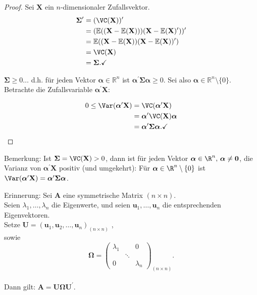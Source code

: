 \documentclass{tstextbook}
\begin{document}
\begin{proof}
	Sei $ \textbf{X} $ ein $n$-dimensionaler Zufallsvektor. 
	\begin{align*}
	\boldsymbol{\Sigma}^\prime &=(\VC(\textbf{X}))^\prime \\
	& = (\mathbb{E}((\textbf{X}-\mathbb{E}(\textbf{X})))(\textbf{X}-\mathbb{E}(\textbf{X})^\prime))^\prime \\
	& = \mathbb{E}((\textbf{X}-\mathbb{E}(\textbf{X}))(\textbf{X}-\mathbb{E}(\textbf{X}))^\prime)\\
	& = \VC(\textbf{X})\\
	& = \boldsymbol{\Sigma}.\checkmark
\end{align*}

$ \boldsymbol{\Sigma}\ge0\ldots $ d.h. für jeden Vektor $ \boldsymbol{\alpha}\in\mathbb{R}^n $ ist $ \boldsymbol{\alpha}^\prime\boldsymbol{\Sigma}\boldsymbol{\alpha}\ge0. $
Sei also $ \boldsymbol{\alpha}\in\mathbb{R}^n\setminus\{0\}. $ Betrachte die Zufallsvariable $ \boldsymbol{\alpha}^\prime \textbf{X}: $

\begin{align*}	
	0 \le \Var(\boldsymbol{\alpha}^\prime \textbf{X}) & = \VC(\boldsymbol{\alpha}^\prime \textbf{X}) \\
	&= \boldsymbol{\alpha}^\prime \VC(\textbf{X})\boldsymbol{\alpha}\\
	&= \boldsymbol{\alpha}^\prime\boldsymbol{\Sigma}\boldsymbol{\alpha}.\checkmark	
\end{align*}	

\end{proof}

\begin{remark}
	Bemerkung: Ist $ \boldsymbol{\Sigma} = \VC(\textbf{X}) > 0 $, dann ist für jeden Vektor $ \boldsymbol{\alpha} \in \R^n, \, \boldsymbol{\alpha} \ne \boldsymbol{0} $, die Varianz von $ \boldsymbol{\alpha}^\prime \textbf{X} $ positiv (und umgekehrt): 
	Für $ \boldsymbol{\alpha} \in \R^n\setminus\{0\} $ ist $ \Var(\boldsymbol{\alpha}^\prime \textbf{X}) = \boldsymbol{\alpha}^\prime \boldsymbol{\Sigma} \boldsymbol{\alpha} $.
\end{remark}

\begin{remark}
	Erinnerung: Sei $ \textbf{A} $ eine symmetrische Matrix $ (n\times n) $. \\
	Seien $ \lambda_1, \ldots, \lambda_n $ die Eigenwerte, und seien $ \textbf{u}_1,\ldots, \textbf{u}_n $ die entsprechenden Eigenvektoren. \\
	Setze $ \textbf{U} = (\textbf{u}_1, \textbf{u}_2, \ldots, \textbf{u}_n)_{(n \times n)}$ , \\
	sowie \[ \boldsymbol{\Omega} = \begin{pmatrix}
		\lambda_1 & & 0  \\
		& \ddots \\
		0 & & \lambda_n
	\end{pmatrix}_{(n\times n)}. \] \\
	Dann gilt: $ \textbf{A} = \textbf{U} \boldsymbol{\Omega} \textbf{U}^\prime . $
	
\end{remark}
\end{document}
